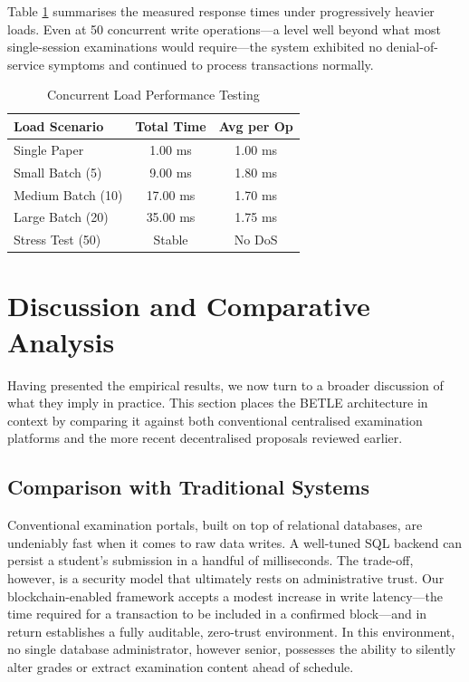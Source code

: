 \documentclass[final,5p,times]{elsarticle}
\begin{document}
Table \ref{tab:scalability} summarises the measured response times under progressively heavier loads. Even at 50 concurrent write operations—a level well beyond what most single-session examinations would require—the system exhibited no denial-of-service symptoms and continued to process transactions normally.

\begin{table}[H]
\caption{Concurrent Load Performance Testing}
\label{tab:scalability}
\centering
\begin{tabularx}{\linewidth}{X c c}
\toprule
\textbf{Load Scenario} & \textbf{Total Time} & \textbf{Avg per Op} \\ \midrule
Single Paper & 1.00 ms & 1.00 ms \\
Small Batch (5) & 9.00 ms & 1.80 ms \\
Medium Batch (10) & 17.00 ms & 1.70 ms \\
Large Batch (20) & 35.00 ms & 1.75 ms \\
Stress Test (50) & Stable & No DoS \\ \bottomrule
\end{tabularx}
\end{table}

\section{Discussion and Comparative Analysis}

Having presented the empirical results, we now turn to a broader discussion of what they imply in practice. This section places the BETLE architecture in context by comparing it against both conventional centralised examination platforms and the more recent decentralised proposals reviewed earlier.

\subsection{Comparison with Traditional Systems}
Conventional examination portals, built on top of relational databases, are undeniably fast when it comes to raw data writes. A well-tuned SQL backend can persist a student's submission in a handful of milliseconds. The trade-off, however, is a security model that ultimately rests on administrative trust. Our blockchain-enabled framework accepts a modest increase in write latency—the time required for a transaction to be included in a confirmed block—and in return establishes a fully auditable, zero-trust environment. In this environment, no single database administrator, however senior, possesses the ability to silently alter grades or extract examination content ahead of schedule.
\end{document}
